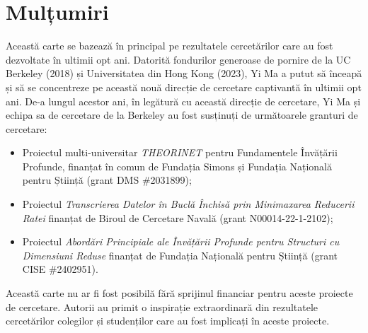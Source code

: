 \documentclass[../../book-main_ro.tex]{subfiles}
\begin{document}
\chapter*{Mulțumiri}
Această carte se bazează în principal pe rezultatele cercetărilor care au fost dezvoltate în ultimii opt ani. Datorită fondurilor generoase de pornire de la UC Berkeley (2018) și Universitatea din Hong Kong (2023), Yi Ma a putut să înceapă și să se concentreze pe această nouă direcție de cercetare captivantă în ultimii opt ani. De-a lungul acestor ani, în legătură cu această direcție de cercetare, Yi Ma și echipa sa de cercetare de la Berkeley au fost susținuți de următoarele granturi de cercetare:
\begin{itemize}
    \item Proiectul multi-universitar {\em THEORINET} pentru Fundamentele Învățării Profunde, finanțat în comun de Fundația Simons și Fundația Națională pentru Știință (grant DMS \#2031899);
    \item Proiectul {\em Transcrierea Datelor în Buclă Închisă prin Minimaxarea Reducerii Ratei} finanțat de Biroul de Cercetare Navală (grant N00014-22-1-2102); 
    \item Proiectul {\em Abordări Principiale ale Învățării Profunde pentru Structuri cu Dimensiuni Reduse} finanțat de Fundația Națională pentru Știință (grant CISE \#2402951).
\end{itemize} 
Această carte nu ar fi fost posibilă fără sprijinul financiar pentru aceste proiecte de cercetare. Autorii au primit o inspirație extraordinară din rezultatele cercetărilor colegilor și studenților care au fost implicați în aceste proiecte.
\end{document}
